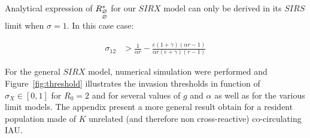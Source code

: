 Analytical expression of $R_{\begin{subarray}{l}\varnothing \\
    \varnothing \end{subarray}}^*$ for our $SIRX$ model can only be
derived in its $SIRS$ limit when $\sigma=1$. In this case case:

\begin{align}
  \label{eq:threshold}
  \sigma_{12} &> \frac{1}{\alpha r} - \frac{e(1+\gamma)(\alpha r-1)}{
    \alpha r (e+\gamma)(r-1)}
\end{align}

For the general $SIRX$ model, numerical simulation were performed and
Figure~\ref{fig:threshold} illustrates the invasion thresholds in
function of $\sigma_{X}\in[0,1]$ for $R_{0}=2$ and for several values
of $g$ and $\alpha$ as well as for the various limit models. The
appendix present a more general result obtain for a resident
population made of $K$ unrelated (and therefore non cross-reactive)
co-circulating IAU.


